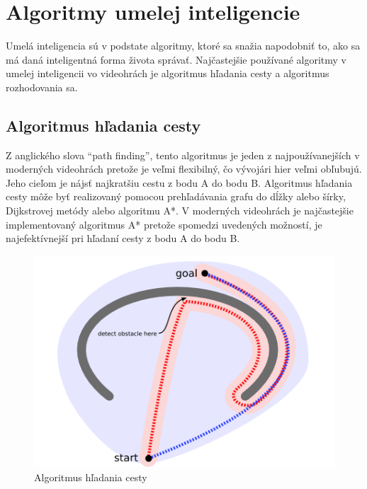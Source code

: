 \documentclass[10pt,oneside,slovak,a4paper]{article}
\begin{document}
\section{Algoritmy umelej inteligencie} \label{kapitola3}
Umelá inteligencia sú v podstate algoritmy, ktoré sa snažia napodobniť to, ako sa má daná inteligentná forma života správať. Najčastejšie používané algoritmy v umelej inteligencii vo videohrách je algoritmus hľadania cesty a algoritmus rozhodovania sa.

\subsection{Algoritmus hľadania cesty} \label{kapitola3.1}
Z anglického slova “path finding”, tento algoritmus je jeden z najpoužívanejších v moderných videohrách pretože je veľmi flexibilný, čo vývojári hier veľmi obľubujú. Jeho cieľom je nájsť najkratšiu cestu z bodu A do bodu B. Algoritmus hľadania cesty môže byť realizovaný pomocou prehľadávania grafu do dĺžky alebo šírky, Dijkstrovej metódy alebo algoritmu A*. V moderných videohrách je najčastejšie implementovaný algoritmus A* pretože spomedzi uvedených možností, je najefektívnejší pri hľadaní cesty z bodu A do bodu B. 
\begin{figure}[tbh]
	\centering
	\includegraphics[scale=0.5]{Aalgo.png}
	\caption{Algoritmus hľadania cesty}
	\label{obr5}
\end{figure}
\end{document}

